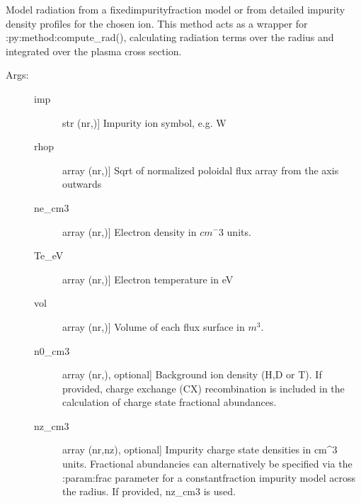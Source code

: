 \documentclass[letterpaper,10pt,english]{sphinxmanual}
\begin{document}
\begin{fulllineitems}
\label{\detokenize{aurora:aurora.radiation.radiation_model}}
Model radiation from a fixed\sphinxhyphen{}impurity\sphinxhyphen{}fraction model or from detailed impurity density
profiles for the chosen ion. This method acts as a wrapper for :py:method:compute\_rad(), 
calculating radiation terms over the radius and integrated over the plasma cross section.
\begin{description}
\item[{Args:}] \leavevmode\begin{description}
\item[{imp}] \leavevmode{[}str (nr,){]}
Impurity ion symbol, e.g. W

\item[{rhop}] \leavevmode{[}array (nr,){]}
Sqrt of normalized poloidal flux array from the axis outwards

\item[{ne\_cm3}] \leavevmode{[}array (nr,){]}
Electron density in \(cm^-3\) units.

\item[{Te\_eV}] \leavevmode{[}array (nr,){]}
Electron temperature in eV

\item[{vol}] \leavevmode{[}array (nr,){]}
Volume of each flux surface in \(m^3\).

\item[{n0\_cm3}] \leavevmode{[}array (nr,), optional{]}
Background ion density (H,D or T). If provided, charge exchange (CX) 
recombination is included in the calculation of charge state fractional 
abundances.

\item[{nz\_cm3}] \leavevmode{[}array (nr,nz), optional{]}
Impurity charge state densities in cm\textasciicircum{}\sphinxhyphen{}3 units. Fractional abundancies can 
alternatively be specified via the :param:frac parameter for a constant\sphinxhyphen{}fraction
impurity model across the radius. If provided, nz\_cm3 is used.


\end{description}
\end{description}
\end{fulllineitems}
\end{document}
